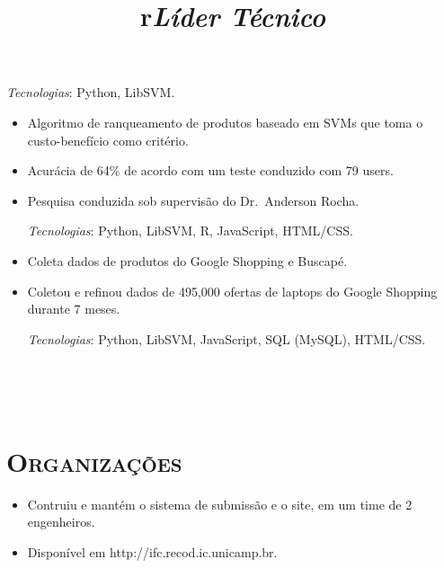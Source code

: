 \begin{resume}
\begin{position}
\begin{itemize}
\vspace{1mm}
{\small \emph{Tecnologias}: Python, LibSVM.}
\end{itemize}
\end{position}

\begin{position}
\vspace{1mm}
\begin{itemize}\small
\item Algoritmo de ranqueamento de produtos baseado em SVMs que toma o custo-benef\'icio como crit\'erio.
\item Acur\'acia de 64\% de acordo com um teste conduzido com 79 users.
\item Pesquisa conduzida sob supervis\~ao do Dr.\ Anderson Rocha.

\vspace{1mm}
{\small \emph{Tecnologias}: Python, LibSVM, R, JavaScript, HTML/CSS\@.}
\end{itemize}
\end{position}

\begin{position}
\vspace{1mm}
\begin{itemize}\small
\item Coleta dados de produtos do Google Shopping e Buscap\'e.
\item Coletou e refinou dados de 495,000 ofertas de laptops do Google Shopping
  durante 7 meses.

\vspace{1mm}
{\small \emph{Tecnologias}: Python, LibSVM, JavaScript, SQL (MySQL), HTML/CSS\@.}
\end{itemize}
\end{position}


\begin{formatb}
  \\
  \title{r}\\
\end{formatb}

\section{\textsc{Organiza\c{c}\~oes}}

\title{\emph{L\'ider T\'ecnico}}
\begin{position}
\vspace{1mm}
\begin{itemize}\small
\item Contruiu e mant\'em o sistema de submiss\~ao e o site, em um time de 2
  engenheiros.
\item Dispon\'ivel em http://ifc.recod.ic.unicamp.br.


\end{itemize}
\end{position}
\end{resume}
